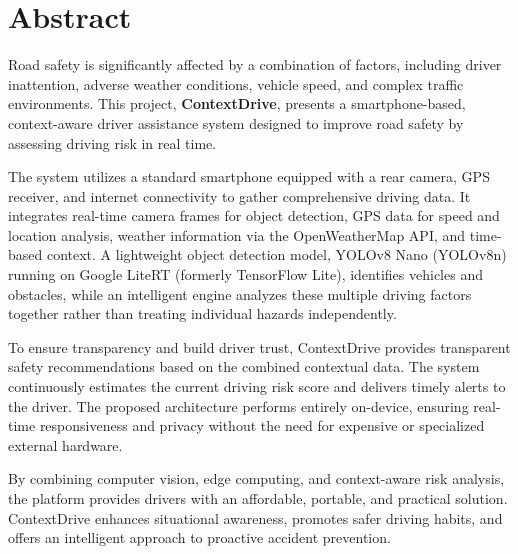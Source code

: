 \chapter*{Abstract}

Road safety is significantly affected by a combination of factors, including driver inattention, adverse weather conditions, vehicle speed, and complex traffic environments. This project, \textbf{ContextDrive}, presents a smartphone-based, context-aware driver assistance system designed to improve road safety by assessing driving risk in real time.

The system utilizes a standard smartphone equipped with a rear camera, GPS receiver, and internet connectivity to gather comprehensive driving data. It integrates real-time camera frames for object detection, GPS data for speed and location analysis, weather information via the OpenWeatherMap API, and time-based context. A lightweight object detection model, YOLOv8 Nano (YOLOv8n) running on Google LiteRT (formerly TensorFlow Lite), identifies vehicles and obstacles, while an intelligent engine analyzes these multiple driving factors together rather than treating individual hazards independently.

To ensure transparency and build driver trust, ContextDrive provides transparent safety recommendations based on the combined contextual data. The system continuously estimates the current driving risk score and delivers timely alerts to the driver. The proposed architecture performs entirely on-device, ensuring real-time responsiveness and privacy without the need for expensive or specialized external hardware.

By combining computer vision, edge computing, and context-aware risk analysis, the platform provides drivers with an affordable, portable, and practical solution. ContextDrive enhances situational awareness, promotes safer driving habits, and offers an intelligent approach to proactive accident prevention.